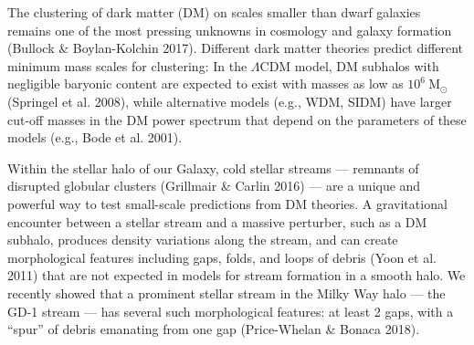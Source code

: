 \documentclass[11pt]{article}
\date{}
\author{}
\newcommand{\msun}{\textrm{M}_\odot}
\begin{document}
\maketitle

\vspace{-1em}
The clustering of dark matter (DM) on scales smaller than dwarf galaxies remains one of the most pressing unknowns in cosmology and galaxy formation (Bullock \& Boylan-Kolchin 2017).
Different dark matter theories predict different minimum mass scales for clustering: In the $\Lambda$CDM model, DM subhalos with negligible baryonic content are expected to exist with masses as low as $10^{6}~\msun$ (Springel et al. 2008), while alternative models (e.g., WDM, SIDM) have larger cut-off masses in the DM power spectrum that depend on the parameters of these models (e.g., Bode et al. 2001).

Within the stellar halo of our Galaxy, cold stellar streams --- remnants of disrupted globular clusters (Grillmair \& Carlin 2016) --- are a unique and powerful way to test small-scale predictions from DM theories.
A gravitational encounter between a stellar stream and a massive perturber, such as a DM subhalo, produces density variations along the stream, and can create morphological features including gaps, folds, and loops of debris (Yoon et al. 2011) that are not expected in models for stream formation in a smooth halo.
We recently showed that a prominent stellar stream in the Milky Way halo --- the GD-1 stream --- has several such morphological features: at least 2 gaps, with a ``spur'' of debris emanating from one gap (Price-Whelan \& Bonaca 2018).
\end{document}
